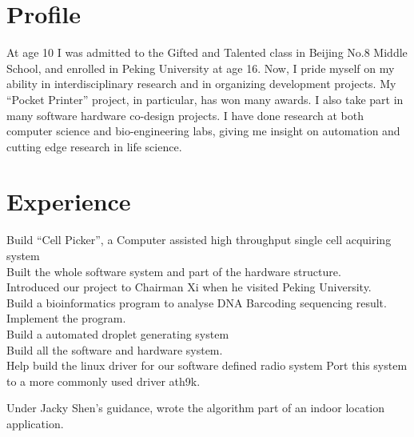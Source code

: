 \documentclass[]{deedy-resume-openfont}
\begin{document}
\hfill
\begin{minipage}[t]{0.62\textwidth} 

\section{Profile}
At age 10 I was admitted to the Gifted and Talented class in Beijing No.8 Middle School, and enrolled in Peking University at age 16. Now, I pride myself on my ability in interdisciplinary research and in organizing development projects. My “Pocket Printer” project, in particular, has won many awards. I also take part in many software hardware co-design projects. I have done research at both computer science and bio-engineering labs, giving me insight on automation and cutting edge research in life science.


\section{Experience}
Build “Cell Picker”, a Computer assisted high throughput single cell acquiring system\\
Built the whole software system and part of the hardware structure.\\
Introduced our project to Chairman Xi when he visited Peking University.\\
Build a bioinformatics program to analyse DNA Barcoding sequencing result.\\
Implement the program.\\
Build a automated droplet generating system\\
Build all the software and hardware system.\\

Help build the linux driver for our software defined radio system
Port this system to a more commonly used driver ath9k.

Under Jacky Shen's guidance, wrote the algorithm part of an indoor location application.


\end{minipage}
\end{document}
